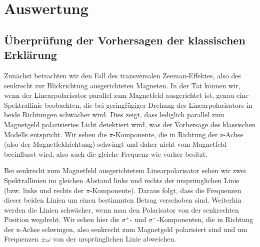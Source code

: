\documentclass[bigchapter,colorback,accentcolor=tud4b,linedtoc,11pt]{tudreport}
\begin{document}






\chapter{Auswertung}
\section{Überprüfung der Vorhersagen der klassischen Erklärung}

Zunächst betrachten wir den Fall des transversalen Zeeman-Effektes, also des senkrecht zur Blickrichtung ausgerichteten Magneten. In der Tat können wir, wenn der Linearpolarisator parallel zum Magnetfeld ausgerichtet ist, genau eine Spektrallinie beobachten, die bei geringfügiger Drehung des Linearpolarisators in beide Richtungen schwächer wird. Dies zeigt, dass lediglich parallel zum Magnetgeld polarisiertes Licht detektiert wird, was der Vorhersage des klassischen Modells entspricht. Wir sehen die $\pi$-Komponente, die in Richtung der z-Achse (also der Magnetfeldrichtung) schwingt und daher nicht vom Magnetfeld beeinflusst wird, also auch die gleiche Frequenz wie vorher besitzt.

Bei senkrecht zum Magnetfeld ausgerichtetem Linearpolarisator sehen wir zwei Spektrallinien im gleichen Abstand links und rechts der ursprünglichen Linie (bzw. links und rechts der $\pi$-Komponente). Daraus folgt, dass die Frequenzen dieser beiden Linien um einen bestimmten Betrag verschoben sind. Weiterhin werden die Linien schwächer, wenn man den Polarisator von der senkrechten Position wegdreht. Wir sehen hier die $\sigma^+$- und $\sigma^-$-Komponenten, die in Richtung der x-Achse schwingen, also senkrecht zum Magnetgeld polarisiert sind und um Frequenzen $\pm \omega$ von der ursprünglichen Linie abweichen.
\end{document}
